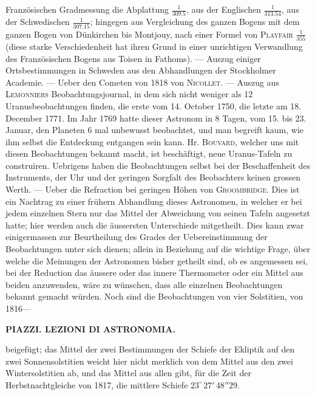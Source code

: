 Französischen Gradmessung die Abplattung $\frac{1}{309.5}$, aus der Englischen $\frac{1}{313.54}$, aus der Schwedischen $\frac{1}{307.15}$; hingegen aus Vergleichung des ganzen Bogens mit dem ganzen Bogen von Dünkirchen bis Montjouy, nach einer Formel von \textsc{Playfair} $\frac{1}{355}$ (diese starke Verschiedenheit hat ihren Grund in einer unrichtigen Verwandlung des Französischen Bogens aus Toisen in Fathoms). --- Auszug einiger Ortsbestimmungen in Schweden aus den Abhandlungen der Stockholmer Academie. --- Ueber den Cometen von 1818 von \textsc{Nicollet}. --- Auszug aus \textsc{Lemonniers} Beobachtungsjournal, in dem sich nicht weniger als 12 Uranusbeobachtungen finden, die erste vom 14. October 1750, die letzte am 18. December 1771. Im Jahr 1769 hatte dieser Astronom in 8 Tagen, vom 15. bis 23. Januar, den Planeten 6 mal unbewusst beobachtet, und man begreift kaum, wie ihm selbst die Entdeckung entgangen sein kann. Hr. \textsc{Bouvard}, welcher uns mit diesen Beobachtungen bekannt macht, ist beschäftigt, neue Uranus-Tafeln zu construiren. Uebrigens haben die Beobachtungen selbst bei der Beschaffenheit des Instruments, der Uhr und der geringen Sorgfalt des Beobachters keinen grossen Werth. --- Ueber die Refraction bei geringen Höhen von \textsc{Groombridge}. Dies ist ein Nachtrag zu einer frühern Abhandlung dieses Astronomen, in welcher er bei jedem einzelnen Stern nur das Mittel der Abweichung von seinen Tafeln angesetzt hatte; hier werden auch die äussersten Unterschiede mitgetheilt. Dies kann zwar einigermassen zur Beurtheilung des Grades der Uebereinstimmung der Beobachtungen unter sich dienen; allein in Beziehung auf die wichtige Frage, über welche die Meinungen der Astronomen bisher getheilt sind, ob es angemessen sei, bei der Reduction das äussere oder das innere Thermometer oder ein Mittel aus beiden anzuwenden, wäre zu wünschen, dass alle einzelnen Beobachtungen bekannt gemacht würden. Noch sind die Beobachtungen von vier Solstitien, von 1816---\par
\clearpage
{}
\noindent\makebox[10mm][l]{}%
\parbox[b]{\dimexpr\textwidth-20mm\relax}{\centering\small\textbf{PIAZZI. LEZIONI DI ASTRONOMIA.}}%
\par\nobreak\medskip
{} beigefügt; das Mittel der zwei Bestimmungen der Schiefe der Ekliptik auf den zwei Sonnensolstitien weicht hier nicht merklich von dem Mittel aus den zwei Wintersolstitien ab, und das Mittel aus allen gibt, für die Zeit der Herbstnachtgleiche von 1817, die mittlere Schiefe $23^\circ\,27'\,48''29$.
